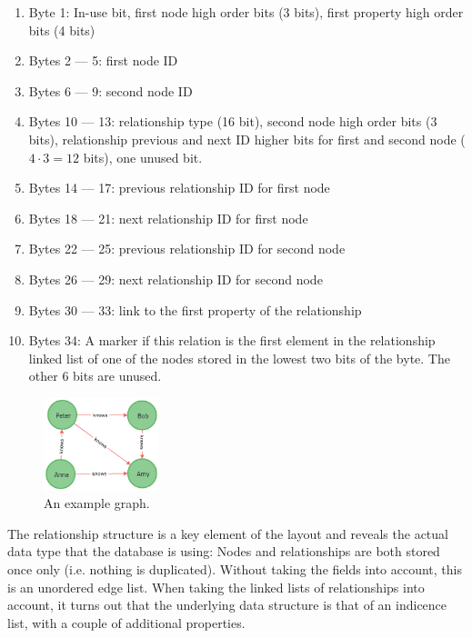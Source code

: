             \begin{enumerate}
                \item Byte 1: In-use bit, first node high order bits (3 bits), first property high order bits (4 bits)
                \item Bytes 2 --- 5: first node ID 
                \item Bytes 6 --- 9: second node ID 
                \item Bytes 10 --- 13: relationship type (16 bit), second node high order bits (3 bits), relationship previous and next ID higher bits for first and second node ($4 \cdot 3 = 12$ bits), one unused bit.
                \item Bytes 14 --- 17: previous relationship ID for first node
                \item Bytes 18 --- 21: next relationship ID for first node
                \item Bytes 22 --- 25: previous relationship ID for second node
                \item Bytes 26 --- 29: next relationship ID for second node
                \item Bytes 30 --- 33: link to the first property of the relationship
                \item Bytes 34: A marker if this relation is the first element in the relationship linked list of one of the nodes stored in the lowest two bits of the byte. 
                The other 6 bits are unused.
            \end{enumerate}
            
            \begin{figure}[htp]
                \begin{center}
                    \includegraphics[keepaspectratio,height=0.4\textheight,width=0.3\textwidth]{img/03-preliminaries/graph.png}
                \end{center}
                \caption{An example graph.}
                \label{n4j-ex-gr}
            \end{figure}
            
            The relationship structure is a key element of the layout and reveals the actual data type that the database is using:
            Nodes and relationships are both stored once only (i.e. nothing is duplicated).
            Without taking the fields into account, this is an unordered edge list.
            When taking the linked lists of relationships into account, it turns out that the underlying data structure is that of an indicence list, with a couple of additional properties.
            
